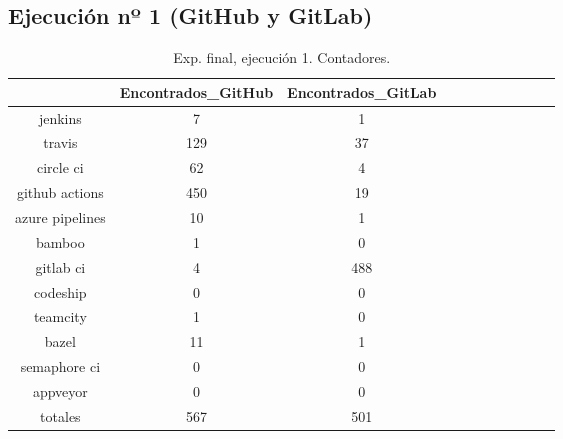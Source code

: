 

\subsection{Ejecución nº 1 (GitHub y GitLab)}

\begin{table}[h]
  \centering
  \caption{Exp. final, ejecución 1. Contadores.}
  \label{tab:tabla_f1_1}

\begin{footnotesize}
\renewcommand{\arraystretch}{1.5} %
\begin{tabular}{ccccccccccc}
  \hline
  {} &  Encontrados\_GitHub &  Encontrados\_GitLab \\
  \hline
  jenkins         &                   7 &                   1 \\
  travis          &                 129 &                  37 \\
  circle ci       &                  62 &                   4 \\
  github actions  &                 450 &                  19 \\
  azure pipelines &                  10 &                   1 \\
  bamboo          &                   1 &                   0 \\
  gitlab ci       &                   4 &                 488 \\
  codeship        &                   0 &                   0 \\
  teamcity        &                   1 &                   0 \\
  bazel           &                  11 &                   1 \\
  semaphore ci    &                   0 &                   0 \\
  appveyor        &                   0 &                   0 \\
  totales         &                 567 &                 501 \\
 \end{tabular}
\end{footnotesize}

\end{table}

